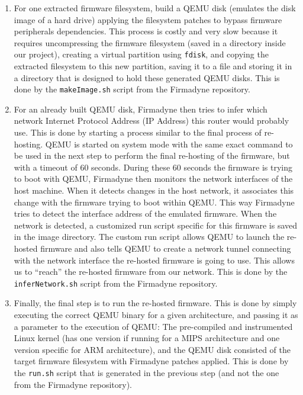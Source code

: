 \begin{enumerate}
    \item For one extracted firmware filesystem, build a QEMU disk (emulates the disk image of a hard drive) applying the filesystem patches to bypass firmware peripherals dependencies. This process is costly and very slow because it requires uncompressing the firmware filesystem (saved in a directory inside our project), creating a virtual partition using {\tt fdisk}, and copying the extracted filesystem to this new partition, saving it to a file and storing it in a directory that is designed to hold these generated QEMU disks. This is done by the {\tt makeImage.sh} script from the Firmadyne repository.
    
    \item For an already built QEMU disk, Firmadyne then tries to infer which network Internet Protocol Address (IP Address) this router would probably use. This is done by starting a process similar to the final process of re-hosting. QEMU is started on system mode with the same exact command to be used in the next step to perform the final re-hosting of the firmware, but with a timeout of 60 seconds. During these 60 seconds the firmware is trying to boot with QEMU, Firmadyne then monitors the network interfaces of the host machine. When it detects changes in the host network, it associates this change with the firmware trying to boot within QEMU. This way Firmadyne tries to detect the interface address of the emulated firmware. When the network is detected, a customized run script specific for this firmware is saved in the image directory. The custom run script allows QEMU to launch the re-hosted firmware and also tells QEMU to create a network tunnel connecting with the network interface the re-hosted firmware is going to use. This allows us to ``reach'' the re-hosted firmware from our network. This is done by the {\tt inferNetwork.sh} script from the Firmadyne repository.
    
    \item Finally, the final step is to run the re-hosted firmware. This is done by simply executing the correct QEMU binary for a given architecture, and passing it as a parameter to the execution of QEMU: The pre-compiled and instrumented Linux kernel (has one version if running for a MIPS architecture and one version specific for ARM architecture), and the QEMU disk consisted of the target firmware filesystem with Firmadyne patches applied. This is done by the {\tt run.sh} script that is generated in the previous step (and not the one from the Firmadyne repository).
\end{enumerate}


